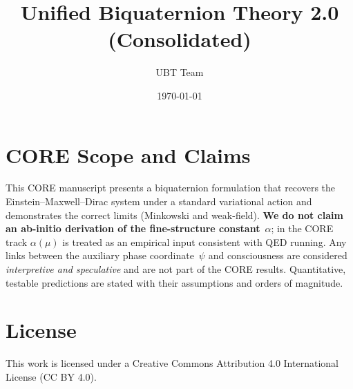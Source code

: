 \documentclass[12pt]{article}
\title{Unified Biquaternion Theory 2.0 (Consolidated)}
\author{UBT Team}
\date{\today}
\begin{document}
\maketitle
\tableofcontents

\section*{CORE Scope and Claims}
This CORE manuscript presents a biquaternion formulation that recovers the Einstein--Maxwell--Dirac system under a standard variational action and demonstrates the correct limits (Minkowski and weak-field). \textbf{We do not claim an ab-initio derivation of the fine-structure constant}~$\alpha$; in the CORE track $\alpha(\mu)$ is treated as an empirical input consistent with QED running. Any links between the auxiliary phase coordinate~$\psi$ and consciousness are considered \emph{interpretive and speculative} and are not part of the CORE results. Quantitative, testable predictions are stated with their assumptions and orders of magnitude.


\appendix













\section*{License}
This work is licensed under a Creative Commons Attribution 4.0 International License (CC BY 4.0).
\end{document}
